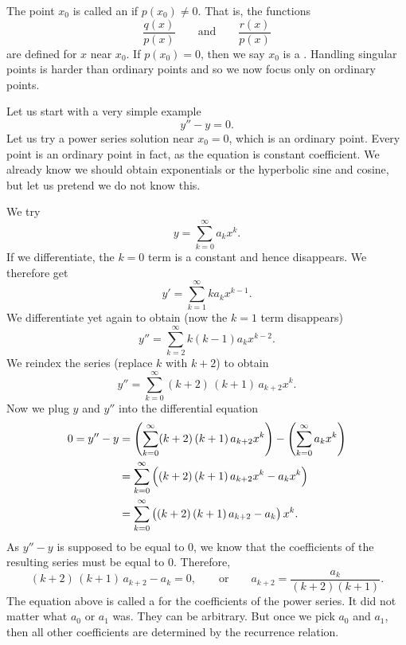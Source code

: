 The point $x_0$ is called an \emph{}
if $p(x_0) \not= 0$.  That is, the functions
\begin{equation*}
\frac{q(x)}{p(x)} \qquad \text{and} \qquad \frac{r(x)}{p(x)}
\end{equation*}
are defined for $x$ near $x_0$.  If $p(x_0) = 0$, then we say $x_0$
is a \emph{}.  Handling singular points is
harder than ordinary points and so we now focus only on ordinary points.

\begin{example}
Let us start with a very simple example
\begin{equation*}
y'' - y = 0 .
\end{equation*}
Let us try a power series solution near $x_0 = 0$,
which is an ordinary point.  Every point is an ordinary
point in fact, as the equation is constant coefficient.  We already know
we should obtain exponentials or the hyperbolic sine and cosine,
but let us pretend we do not know this.

We try
\begin{equation*}
y = \sum_{k=0}^\infty a_k x^k .
\end{equation*}
If we differentiate, the $k=0$ term is a constant and hence disappears.
We therefore get
\begin{equation*}
y' = \sum_{k=1}^\infty k a_k x^{k-1} .
\end{equation*}
We differentiate yet again to obtain (now the $k=1$ term disappears)
\begin{equation*}
y'' = \sum_{k=2}^\infty k(k-1) a_k x^{k-2} .
\end{equation*}
We reindex the series (replace $k$ with $k+2$) to obtain
\begin{equation*}
y'' = \sum_{k=0}^\infty (k+2)\,(k+1) \, a_{k+2} x^k .
\end{equation*}
Now we plug $y$ and $y''$ into the differential equation
\begin{equation*}
\begin{split}
0 = y''-y & = 
\Biggl( \sum_{k=0}^\infty (k+2)\,(k+1) \, a_{k+2} x^k  \Biggr)
-
\Biggl( \sum_{k=0}^\infty a_k x^k \Biggr)
\\
& =
\sum_{k=0}^\infty \,\Bigl( (k+2)\,(k+1) \, a_{k+2} x^k 
-
a_k x^k \Bigr)
\\
& =
\sum_{k=0}^\infty \,\bigl( (k+2)\,(k+1) \,a_{k+2} - a_k \bigr) \, x^k  .
\end{split}
\end{equation*}
As $y'' - y$ is supposed to be equal to 0, we know that the
coefficients of the resulting series must be equal to 0.  Therefore,
\begin{equation*}
(k+2)\,(k+1) \,a_{k+2} - a_k = 0 ,
\qquad
\text{or}
\qquad
a_{k+2} = \frac{a_k}{(k+2)(k+1)} .
\end{equation*}
The equation above is called a \emph{}
for the coefficients of the power series.
It did not matter what $a_0$ or $a_1$ was.  They can be arbitrary.
But once we pick $a_0$ and $a_1$, then all other coefficients are
determined by the recurrence relation.


\end{example}
